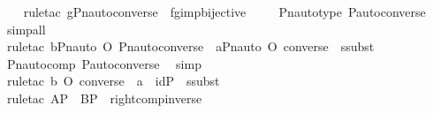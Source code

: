 \begin{isabellebody}
\ \ \isamarkupfalse%
\ {\isacharparenleft}{\kern0pt}rule{\isacharunderscore}{\kern0pt}tac\ g{\isacharequal}{\kern0pt}{\isachardoublequoteopen}Pn{\isacharunderscore}{\kern0pt}auto{\isacharparenleft}{\kern0pt}converse{\isacharparenleft}{\kern0pt}{\isasympi}{\isacharparenright}{\kern0pt}{\isacharparenright}{\kern0pt}{\isachardoublequoteclose}\ \ fg{\isacharunderscore}{\kern0pt}imp{\isacharunderscore}{\kern0pt}bijective{\isacharparenright}{\kern0pt}\ \isanewline
\ \ \isamarkupfalse%
\ Pn{\isacharunderscore}{\kern0pt}auto{\isacharunderscore}{\kern0pt}type\ P{\isacharunderscore}{\kern0pt}auto{\isacharunderscore}{\kern0pt}converse\ \isamarkupfalse%
\ simp{\isacharunderscore}{\kern0pt}all\ \isanewline
\ \ \isamarkupfalse%
\ {\isacharparenleft}{\kern0pt}rule{\isacharunderscore}{\kern0pt}tac\ b{\isacharequal}{\kern0pt}{\isachardoublequoteopen}Pn{\isacharunderscore}{\kern0pt}auto{\isacharparenleft}{\kern0pt}{\isasympi}{\isacharparenright}{\kern0pt}\ O\ Pn{\isacharunderscore}{\kern0pt}auto{\isacharparenleft}{\kern0pt}converse{\isacharparenleft}{\kern0pt}{\isasympi}{\isacharparenright}{\kern0pt}{\isacharparenright}{\kern0pt}{\isachardoublequoteclose}\ \ a{\isacharequal}{\kern0pt}{\isachardoublequoteopen}Pn{\isacharunderscore}{\kern0pt}auto{\isacharparenleft}{\kern0pt}{\isasympi}\ O\ converse{\isacharparenleft}{\kern0pt}{\isasympi}{\isacharparenright}{\kern0pt}{\isacharparenright}{\kern0pt}{\isachardoublequoteclose}\ \ ssubst{\isacharparenright}{\kern0pt}\ \isanewline
\ \ \isamarkupfalse%
\ Pn{\isacharunderscore}{\kern0pt}auto{\isacharunderscore}{\kern0pt}comp\ P{\isacharunderscore}{\kern0pt}auto{\isacharunderscore}{\kern0pt}converse\ \isamarkupfalse%
\ simp\ \isanewline
\ \ \isamarkupfalse%
\ {\isacharparenleft}{\kern0pt}rule{\isacharunderscore}{\kern0pt}tac\ b{\isacharequal}{\kern0pt}{\isachardoublequoteopen}{\isasympi}\ O\ converse{\isacharparenleft}{\kern0pt}{\isasympi}{\isacharparenright}{\kern0pt}{\isachardoublequoteclose}\ \ a\ {\isacharequal}{\kern0pt}\ {\isachardoublequoteopen}id{\isacharparenleft}{\kern0pt}P{\isacharparenright}{\kern0pt}{\isachardoublequoteclose}\ \ ssubst{\isacharparenright}{\kern0pt}\ \isanewline
\ \ \isamarkupfalse%
\ {\isacharparenleft}{\kern0pt}rule{\isacharunderscore}{\kern0pt}tac\ A{\isacharequal}{\kern0pt}P\ \ B{\isacharequal}{\kern0pt}P\ \ right{\isacharunderscore}{\kern0pt}comp{\isacharunderscore}{\kern0pt}inverse{\isacharparenright}{\kern0pt}\ \isamarkupfalse%

\end{isabellebody}
